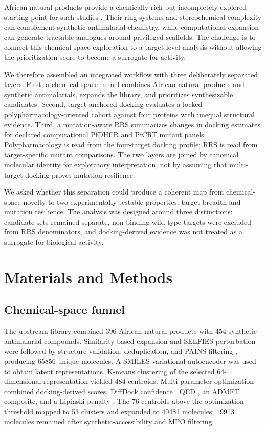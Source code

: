 \documentclass[journal=jcisd8,manuscript=article]{achemso}
\begin{document}
African natural products provide a chemically rich but incompletely explored starting point for such studies \cite{Newman2007,NtieKang2018,Simoben2023,Cheuka2020}. Their ring systems and stereochemical complexity can complement synthetic antimalarial chemistry, while computational expansion can generate tractable analogues around privileged scaffolds. The challenge is to connect this chemical-space exploration to a target-level analysis without allowing the prioritization score to become a surrogate for activity.

We therefore assembled an integrated workflow with three deliberately separated layers. First, a chemical-space funnel combines African natural products and synthetic antimalarials, expands the library, and prioritizes synthesizable candidates. Second, target-anchored docking evaluates a locked polypharmacology-oriented cohort against four proteins with unequal structural evidence. Third, a mutation-aware RRS summarizes changes in docking estimates for declared computational PfDHFR and PfCRT mutant panels. Polypharmacology is read from the four-target docking profile; RRS is read from target-specific mutant comparisons. The two layers are joined by canonical molecular identity for exploratory interpretation, not by assuming that multi-target docking proves mutation resilience.

We asked whether this separation could produce a coherent map from chemical-space novelty to two experimentally testable properties: target breadth and mutation resilience. The analysis was designed around three distinctions: candidate sets remained separate, non-binding wild-type targets were excluded from RRS denominators, and docking-derived evidence was not treated as a surrogate for biological activity.

\section{Materials and Methods}
\subsection{Chemical-space funnel}
The upstream library combined \num{396} African natural products with \num{454} synthetic antimalarial compounds. Similarity-based expansion and SELFIES perturbation \cite{Nigam2021,Krenn2020} were followed by structure validation, deduplication, and PAINS filtering \cite{Baell2010}, producing \num{65856} unique molecules. A SMILES variational autoencoder \cite{Kingma2013} was used to obtain latent representations. K-means clustering of the selected 64-dimensional representation yielded \num{484} centroids. Multi-parameter optimization combined docking-derived scores, DiffDock confidence \cite{Corso2023}, QED \cite{Bickerton2012}, an ADMET composite, and a Lipinski penalty \cite{Lipinski2004}. The \num{76} centroids above the optimization threshold mapped to \num{53} clusters and expanded to \num{40481} molecules; \num{19913} molecules remained after synthetic-accessibility and MPO filtering.
\end{document}
